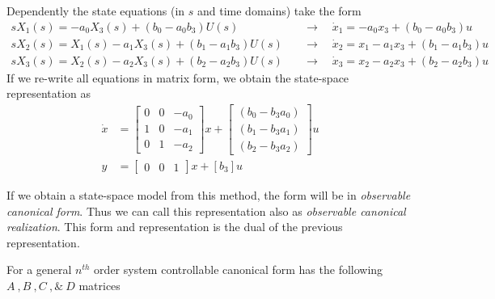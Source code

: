 \documentclass[twoside]{article}
\begin{document}
% 
Dependently the state equations (in $s$ and time domains) take the form
%
%
\begin{align*}
s X_1(s) = -a_0 X_3(s)  + ( b_0 - a_0 b_3) U(s) \quad &\rightarrow \quad \dot{x}_1 = -a_0 x_3  + ( b_0 - a_0 b_3) u
\\
s X_2(s) = X_1(s)  -a_1 X_3(s) + ( b_1 - a_1 b_3 ) U(s)  \quad &\rightarrow \quad \dot{x}_2 = x_1  - a_1 x_3 + ( b_1 - a_1 b_3 ) u
\\
s X_3(s) = X_2(s)  -a_2 X_3(s) + ( b_2 - a_2 b_3 ) U(s)  \quad &\rightarrow \quad \dot{x}_3 = x_2  - a_2 x_3 + ( b_2 - a_2 b_3 ) u
\end{align*}
%
If we re-write all equations in matrix form, we obtain the state-space representation as
%
\begin{align*}
	\dot{x} &= \left[ \begin{array}{ccc} 0 & 0 & -a_0  \\  1 & 0 & -a_1 \\  0 & 1 & -a_2 \end{array} \right] x 
	+ \left[ \begin{array}{c} ( b_0 - b_3 a_0 ) \\ ( b_1 - b_3 a_1 ) \\ ( b_2 - b_3 a_2 ) \end{array} \right] u
	\\
	y &= \left[ \begin{array}{ccc} 0 & 0  & 1 \end{array} \right] x
	+ \left[ b_3 \right] u
\end{align*}

If we obtain a state-space model from this method, the form
will be in \textit{observable canonical form}. Thus we can call this representation also as 
\textit{observable canonical realization}. This form and
representation is the dual of the previous representation. 

For a general $n^{th}$ order system controllable
canonical form has the following $A \ ,  B \ ,  C \ , \& \ D$
matrices
\end{document}
